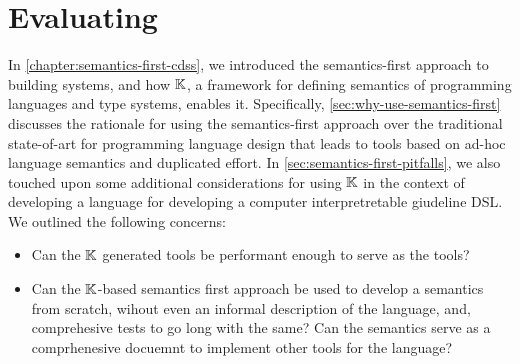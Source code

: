 \chapter{Evaluating \K{}}\label{chapter:evaluating-k}

In \autoref{chapter:semantics-first-cdss}, we introduced the
semantics-first approach to building systems, and how $\mathbb{K}$,
a framework for defining semantics of programming languages and
type systems, enables it. Specifically, \autoref{sec:why-use-semantics-first}
discusses the rationale for using the semantics-first approach over
the traditional state-of-art for programming language design that
leads to tools based on ad-hoc language semantics and duplicated effort.
In \autoref{sec:semantics-first-pitfalls}, we also touched upon
some additional considerations for using $\mathbb{K}$ in the context of
developing a language for developing a computer interpretretable giudeline DSL.
We outlined the following concerns:
\begin{itemize}
 \item Can the $\mathbb{K}$ generated tools be performant enough to serve as
 the  tools?
 \item Can the $\mathbb{K}$-based semantics first approach be used to develop
 a semantics from scratch, wihout even an informal description of the language,
  and, comprehesive tests to go long with the same? Can the semantics
  serve as a comprhenesive docuemnt to implement other tools for the language?
\end{itemize}




